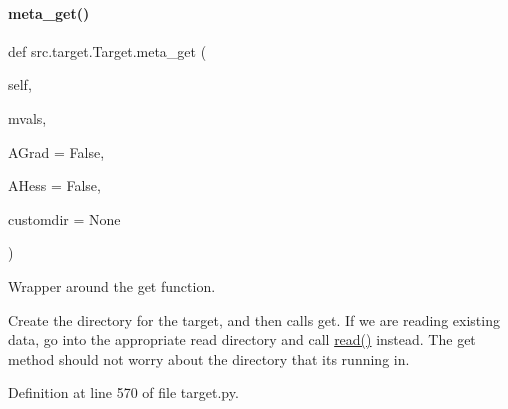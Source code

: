 \paragraph{\texorpdfstring{meta\+\_\+get()}{meta\_get()}}
{\footnotesize\ttfamily def src.\+target.\+Target.\+meta\+\_\+get (\begin{DoxyParamCaption}\item[{}]{self,  }\item[{}]{mvals,  }\item[{}]{A\+Grad = {\ttfamily False},  }\item[{}]{A\+Hess = {\ttfamily False},  }\item[{}]{customdir = {\ttfamily None} }\end{DoxyParamCaption})\hspace{0.3cm}{\ttfamily [inherited]}}



Wrapper around the get function. 

Create the directory for the target, and then calls \textquotesingle{}get\textquotesingle{}. If we are reading existing data, go into the appropriate read directory and call \hyperlink{classsrc_1_1target_1_1RemoteTarget_a33f52ff218e41fc3c3046af7d8107970}{read()} instead. The \textquotesingle{}get\textquotesingle{} method should not worry about the directory that it\textquotesingle{}s running in. 

Definition at line 570 of file target.\+py.

